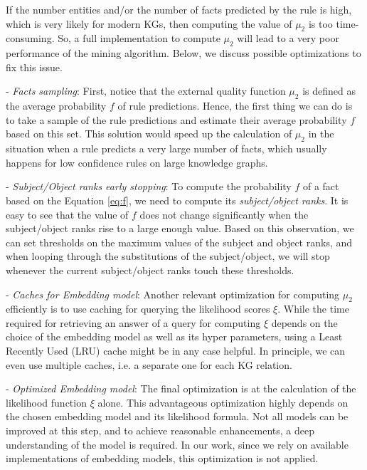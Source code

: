 If the number entities and/or the number of facts predicted by the rule is high, which is very likely for modern KGs, then computing the value of $\mu_2$ is too time-consuming. So, a full implementation to compute $\mu_2$ will lead to a very poor performance of the mining algorithm. Below, we discuss possible optimizations to fix this issue.

\noindent- \textit{Facts sampling}: First, notice that the external quality function $\mu_2$ is defined as the average probability $f$ of rule predictions. Hence, the first thing we can do is to take a sample of the rule predictions and estimate their average probability $f$ based on this set. This solution would speed up the calculation of $\mu_2$ in the situation when a rule predicts a very large number of facts, which usually happens for low confidence rules on large knowledge graphs.

\noindent- \textit{Subject/Object ranks early stopping}: To compute the probability $f$ of a fact based on the Equation \ref{eq:f}, we need to compute its \textit{subject/object ranks}. It is easy to see that the value of $f$ does not change significantly when the subject/object ranks rise to a large enough value. Based on this observation, we can set thresholds on the maximum values of the subject and object ranks, and when looping through the substitutions of the subject/object, we will stop whenever the current subject/object ranks touch these thresholds.

\noindent- \textit{Caches for Embedding model}: Another relevant optimization for computing $\mu_2$ efficiently is to use caching for querying the likelihood scores $\xi$. While the time required for retrieving an answer of a query for computing $\xi$ depends on the choice of the embedding model as well as its hyper parameters, using a Least Recently Used (LRU) cache might be in any case helpful. In principle, we can even use multiple caches, i.e. a separate one for each KG relation.

\noindent- \textit{Optimized Embedding model}: The final optimization is at the calculation of the likelihood function $\xi$ alone. This advantageous optimization highly depends on the chosen embedding model and its likelihood formula. Not all models can be improved at this step, and to achieve reasonable enhancements, a deep understanding of the model is required. In our work, since we rely on available implementations of embedding models, this optimization is not applied.




